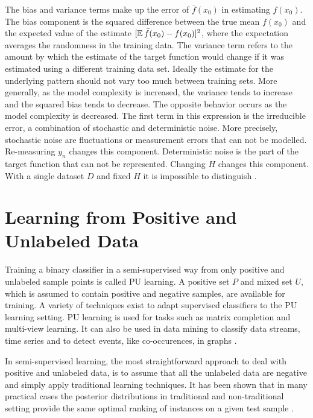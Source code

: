 The bias and variance terms make up the error of \(\bar{f}(x_0)\) in estimating \(f(x_0)\). The bias component is the squared difference between the true mean \(f(x_0)\) and the expected value of the estimate \([\operatorname{\mathbb{E}}\bar{f}(x_0) - f(x_0)]^2\), where the expectation averages the randomness in the training data. The variance term refers to the amount by which the estimate of the target function would change if it was estimated using a different training data set. Ideally the estimate for the underlying pattern should not vary too much between training sets. More generally, as the model complexity is increased, the variance tends to increase and the squared bias tends to decrease. The opposite behavior occurs as the model complexity is decreased. The first term in this expression is the irreducible error, a combination of stochastic and deterministic noise. More precisely, stochastic noise are fluctuations or measurement errors that can not be modelled. Re-measuring \(y_n\) changes this component. Deterministic noise is the part of the target function that can not be represented. Changing \(H\) changes this component. With a single dataset \(D\) and fixed \(H\) it is impossible to distinguish \cite{yaser}.  

\section{Learning from Positive and Unlabeled Data}


\vspace{0.4cm}

Training a binary classifier in a semi-supervised way from only positive and unlabeled sample points is called PU learning. A positive set \(P\) and mixed set \(U\), which is assumed to contain positive and negative samples, are available for training. A variety of techniques exist to adapt supervised classifiers to the PU learning setting. PU learning is used for tasks such as matrix completion and multi-view learning. It can also be used in data mining to classify data streams, time series and to detect events, like co-occurences, in graphs \cite{elkan, claesen}. 

In semi-supervised learning, the most straightforward approach to deal with positive and unlabeled data, is to assume that all the unlabeled data are negative and simply apply traditional learning techniques. It has been shown that in many practical cases the posterior distributions in traditional and non-traditional setting provide the same optimal ranking of instances on a given test sample \cite{jain, claesen}.


